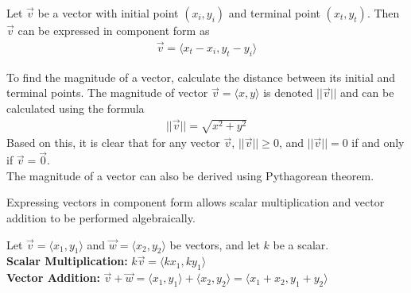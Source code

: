 \documentclass[a4paper]{article}
\let\bf\textbf
\let\la\langle
\let\ra\rangle
\begin{document}
\begin{shaded}
    \noindent Let $\vec{v}$ be a vector with initial point $(x_i,y_i)$ and terminal point $(x_t,y_t)$. Then $\vec{v}$ can be expressed in component form as 
    \begin{align*}
        \vec{v}= \la x_t - x_i, y_t - y_i \ra
    \end{align*}
\end{shaded}
\noindent To find the magnitude of a vector, calculate the distance between its initial and terminal points. The magnitude of vector $\vec{v} = \la x, y \ra$ is denoted $||\vec{v}||$ and can be calculated using the formula
\begin{align*}
    ||\vec{v}|| = \sqrt{x^2 + y^2}
\end{align*}
Based on this, it is clear that for any vector $\vec{v}$, $||\vec{v}|| \geq 0$, and $||\vec{v}|| = 0$ if and only if $\vec{v} = \vec{0}$.\vspace{1mm}\\
The magnitude of a vector can also be derived using Pythagorean theorem.
\begin{center}
\end{center}
Expressing vectors in component form allows scalar multiplication and vector addition to be performed algebraically.
\begin{shaded}
    \noindent Let $\vec{v} = \la x_1, y_1 \ra$ and $\vec{w} = \la x_2,y_2 \ra$ be vectors, and let $k$ be a scalar.\vspace{1mm}\\
    \bf{Scalar Multiplication:} $k\vec{v} = \la kx_1, ky_1 \ra$\\
    \bf{Vector Addition:} $\vec{v} + \vec{w} = \la x_1,y_1 \ra + \la x_2,y_2 \ra = \la x_1 + x_2, y_1 + y_2 \ra$
\end{shaded}
\end{document}
